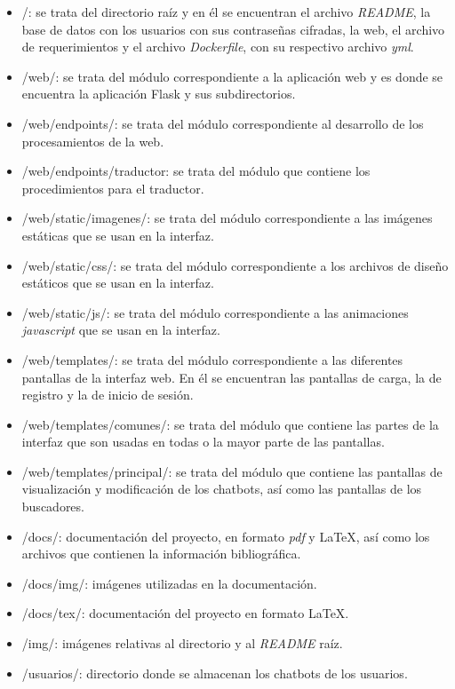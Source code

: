 \begin{itemize}
    \item /: se trata del directorio raíz y en él se encuentran el archivo \textit{README}, la base de datos con los usuarios con sus contraseñas cifradas, la web, el archivo de requerimientos y el archivo \textit{Dockerfile}, con su respectivo archivo \textit{yml}.
    \item /web/: se trata del módulo correspondiente a la aplicación web y es donde se encuentra la aplicación Flask y sus subdirectorios.
    
    \item /web/endpoints/: se trata del módulo correspondiente al desarrollo de los procesamientos de la web.
    \item /web/endpoints/traductor: se trata del módulo que contiene los procedimientos para el traductor.
    
    \item /web/static/imagenes/: se trata del módulo correspondiente a las imágenes estáticas que se usan en la interfaz.
    \item /web/static/css/: se trata del módulo correspondiente a los archivos de diseño estáticos que se usan en la interfaz.
    \item /web/static/js/: se trata del módulo correspondiente a las animaciones \textit{javascript} que se usan en la interfaz.
    
    \item /web/templates/: se trata del módulo correspondiente a las diferentes pantallas de la interfaz web. En él se encuentran las pantallas de carga, la de registro y la de inicio de sesión.
    \item /web/templates/comunes/: se trata del módulo que contiene las partes de la interfaz que son usadas en todas o la mayor parte de las pantallas.
    \item /web/templates/principal/: se trata del módulo que contiene las pantallas de visualización y modificación de los chatbots, así como las pantallas de los buscadores.
    
    \item /docs/: documentación del proyecto, en formato \textit{pdf} y \LaTeX, así como los archivos que contienen la información bibliográfica.
    \item /docs/img/: imágenes utilizadas en la documentación.
    \item /docs/tex/: documentación del proyecto en formato \LaTeX.

    \item /img/: imágenes relativas al directorio y al \textit{README} raíz.
    \item /usuarios/: directorio donde se almacenan los chatbots de los usuarios.
    
\end{itemize}

